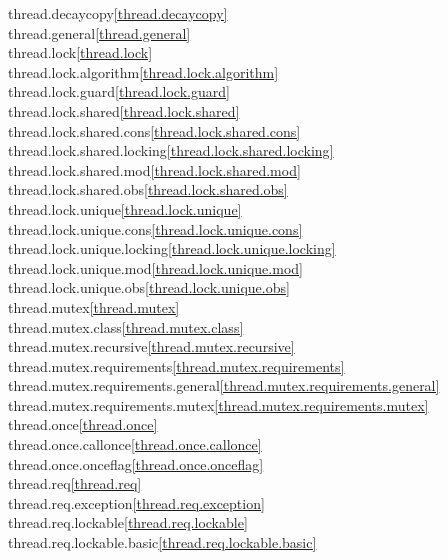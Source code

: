 \begin{multicols}{2}
thread.decaycopy\quad\ref{thread.decaycopy}\\
thread.general\quad\ref{thread.general}\\
thread.lock\quad\ref{thread.lock}\\
thread.lock.algorithm\quad\ref{thread.lock.algorithm}\\
thread.lock.guard\quad\ref{thread.lock.guard}\\
thread.lock.shared\quad\ref{thread.lock.shared}\\
thread.lock.shared.cons\quad\ref{thread.lock.shared.cons}\\
thread.lock.shared.locking\quad\ref{thread.lock.shared.locking}\\
thread.lock.shared.mod\quad\ref{thread.lock.shared.mod}\\
thread.lock.shared.obs\quad\ref{thread.lock.shared.obs}\\
thread.lock.unique\quad\ref{thread.lock.unique}\\
thread.lock.unique.cons\quad\ref{thread.lock.unique.cons}\\
thread.lock.unique.locking\quad\ref{thread.lock.unique.locking}\\
thread.lock.unique.mod\quad\ref{thread.lock.unique.mod}\\
thread.lock.unique.obs\quad\ref{thread.lock.unique.obs}\\
thread.mutex\quad\ref{thread.mutex}\\
thread.mutex.class\quad\ref{thread.mutex.class}\\
thread.mutex.recursive\quad\ref{thread.mutex.recursive}\\
thread.mutex.requirements\quad\ref{thread.mutex.requirements}\\
thread.mutex.requirements.general\quad\ref{thread.mutex.requirements.general}\\
thread.mutex.requirements.mutex\quad\ref{thread.mutex.requirements.mutex}\\
thread.once\quad\ref{thread.once}\\
thread.once.callonce\quad\ref{thread.once.callonce}\\
thread.once.onceflag\quad\ref{thread.once.onceflag}\\
thread.req\quad\ref{thread.req}\\
thread.req.exception\quad\ref{thread.req.exception}\\
thread.req.lockable\quad\ref{thread.req.lockable}\\
thread.req.lockable.basic\quad\ref{thread.req.lockable.basic}\\

\end{multicols}
